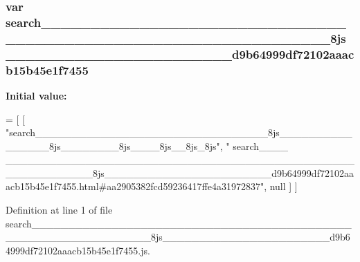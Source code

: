 \subsubsection[{search\+\_\+\+\_\+\+\_\+\+\_\+\+\_\+\+\_\+\+\_\+\+\_\+\+\_\+\+\_\+\+\_\+\+\_\+\+\_\+\+\_\+\+\_\+\+\_\+\+\_\+\+\_\+\+\_\+\+\_\+\+\_\+\+\_\+\+\_\+\+\_\+\+\_\+\+\_\+\+\_\+\+\_\+\+\_\+\+\_\+\+\_\+\+\_\+\+\_\+\+\_\+\+\_\+\+\_\+\+\_\+\+\_\+\+\_\+\+\_\+\+\_\+\+\_\+\+\_\+\+\_\+\+\_\+\+\_\+\+\_\+\+\_\+\+\_\+\+\_\+\+\_\+\+\_\+\+\_\+\+\_\+\+\_\+\+\_\+\+\_\+\+\_\+\+\_\+\+\_\+\+\_\+\+\_\+\+\_\+\+\_\+8js\+\_\+\+\_\+\+\_\+\+\_\+\+\_\+\+\_\+\+\_\+\+\_\+\+\_\+\+\_\+\+\_\+\+\_\+\+\_\+\+\_\+\+\_\+\+\_\+\+\_\+\+\_\+\+\_\+\+\_\+\+\_\+\+\_\+\+\_\+d9b64999df72102aaacb15b45e1f7455}]{\setlength{\rightskip}{0pt plus 5cm}var search\+\_\+\+\_\+\+\_\+\+\_\+\+\_\+\+\_\+\+\_\+\+\_\+\+\_\+\+\_\+\+\_\+\+\_\+\+\_\+\+\_\+\+\_\+\+\_\+\+\_\+\+\_\+\+\_\+\+\_\+\+\_\+\+\_\+\+\_\+\+\_\+\+\_\+\+\_\+\+\_\+\+\_\+\+\_\+\+\_\+\+\_\+\+\_\+\+\_\+\+\_\+\+\_\+\+\_\+\+\_\+\+\_\+\+\_\+\+\_\+\+\_\+\+\_\+\+\_\+\+\_\+\+\_\+\+\_\+\+\_\+\+\_\+\+\_\+\+\_\+\+\_\+\+\_\+\+\_\+\+\_\+\+\_\+\+\_\+\+\_\+\+\_\+\+\_\+\+\_\+\+\_\+\+\_\+\+\_\+\+\_\+8js\+\_\+\+\_\+\+\_\+\+\_\+\+\_\+\+\_\+\+\_\+\+\_\+\+\_\+\+\_\+\+\_\+\+\_\+\+\_\+\+\_\+\+\_\+\+\_\+\+\_\+\+\_\+\+\_\+\+\_\+\+\_\+\+\_\+\+\_\+d9b64999df72102aaacb15b45e1f7455}\label{search__________________________________________________________________________________________83c1a38583e3cb9c3842f249d9b4cfd8_a412ddff5aee72990c926af4e442ef435}
{\bfseries Initial value\+:}
\begin{DoxyCode}
=
[
    [ \textcolor{stringliteral}{"search\_\_\_\_\_\_\_\_\_\_\_\_\_\_\_\_\_\_\_\_\_\_\_\_\_\_\_\_\_\_\_\_8js\_\_\_\_\_\_\_\_\_\_\_\_\_\_\_\_8js\_\_\_\_\_\_\_\_8js\_\_\_\_8js\_\_8js\_8js"}, \textcolor{stringliteral}{"
      search\_\_\_\_
      \_\_\_\_\_\_\_\_\_\_\_\_\_\_\_\_\_\_\_\_\_\_\_\_\_\_\_\_\_\_\_\_\_\_\_\_\_\_\_\_\_\_\_\_\_\_\_\_\_\_\_\_\_\_\_\_\_\_\_\_8js\_\_\_\_\_\_\_\_\_\_\_\_\_\_\_\_\_\_\_\_\_\_\_d9b64999df72102aaacb15b45e1f7455.html#aa2905382fcd59236417ffe4a31972837"}, null ]
]
\end{DoxyCode}


Definition at line 1 of file search\+\_\+\+\_\+\+\_\+\+\_\+\+\_\+\+\_\+\+\_\+\+\_\+\+\_\+\+\_\+\+\_\+\+\_\+\+\_\+\+\_\+\+\_\+\+\_\+\+\_\+\+\_\+\+\_\+\+\_\+\+\_\+\+\_\+\+\_\+\+\_\+\+\_\+\+\_\+\+\_\+\+\_\+\+\_\+\+\_\+\+\_\+\+\_\+\+\_\+\+\_\+\+\_\+\+\_\+\+\_\+\+\_\+\+\_\+\+\_\+\+\_\+\+\_\+\+\_\+\+\_\+\+\_\+\+\_\+\+\_\+\+\_\+\+\_\+\+\_\+\+\_\+\+\_\+\+\_\+\+\_\+\+\_\+\+\_\+\+\_\+\+\_\+\+\_\+\+\_\+\+\_\+\+\_\+\+\_\+\+\_\+8js\+\_\+\+\_\+\+\_\+\+\_\+\+\_\+\+\_\+\+\_\+\+\_\+\+\_\+\+\_\+\+\_\+\+\_\+\+\_\+\+\_\+\+\_\+\+\_\+\+\_\+\+\_\+\+\_\+\+\_\+\+\_\+\+\_\+\+\_\+d9b64999df72102aaacb15b45e1f7455.\+js.

